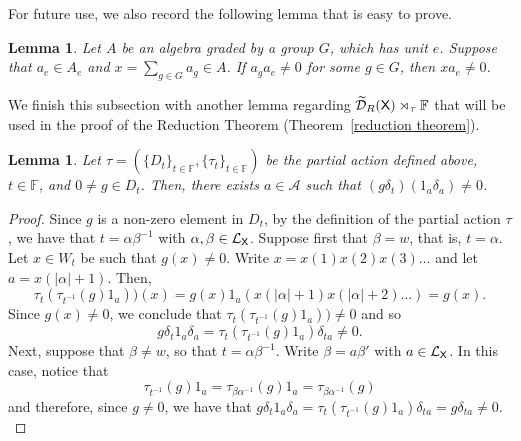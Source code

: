 \documentclass[a4paper,12pt]{amsart}
\newtheorem{lemma}[equation]{Lemma}
\theoremstyle{definition}
\theoremstyle{remark}
\numberwithin{equation}{section}
\newcommand{\osf}{{\normalfont \textsf{X}}}
\newcommand{\lang}{\CL_{\osf}}
\newcommand{\udalgshift}{\TCD_R(\osf)}
\newcommand{\alf}{\mathscr{A}}
\newcommand{\F}{\mathbb{F}}
\newcommand{\CD}{\mathcal{D}}
\newcommand{\CL}{\mathcal{L}}
\newcommand{\TCD}{\widetilde{\CD}}
\begin{document}
For future use, we also record the following lemma that is easy to prove.

\begin{lemma}\label{referee} Let $A$ be an algebra graded by a group $ G$, which has unit $e$. Suppose that $a_e\in A_e$ and $x=\sum_{g \in G} a_g \in A$. If $ a_g a_e \neq 0$ for some $g \in G$, then $x a_e \neq 0$.
\end{lemma}

We finish this subsection with another lemma regarding $ \udalgshift\rtimes_{\tau}\F$ that will be used in the proof of the Reduction Theorem (Theorem~\ref{reduction theorem}).

\begin{lemma}\label{claim1}
    Let $\tau=\left( \{D_t\}_{t\in \F}, \{\tau_t\}_{t\in\F} \right)$ be the partial action defined above, $t\in \F$, and $0\neq g\in D_t$. Then, there exists $a\in \alf$ such that $(g\delta_t)( 1_a\delta_a)\neq 0$.
\end{lemma}
\begin{proof}
Since $g$ is a non-zero element in $D_t$, by the definition of the partial action $\tau$, we have that $t=\alpha\beta^{-1}$ with $\alpha, \beta \in \lang$. 
Suppose first that $\beta =w$, that is, $t=\alpha$. Let $x\in W_t$ be such that $g(x)\neq 0$. Write $x=x(1)x(2)x(3)\ldots$ and let $a=x({|\alpha|+1})$. Then, 
$$\tau_t(\tau_{t^{-1}}(g)1_a))(x)=g(x)1_a\left(x(|\alpha|+1)x(|\alpha|+2)\ldots\right)=g(x).$$ Since $g(x)\neq 0$, we conclude that  
$\tau_t(\tau_{t^{-1}}(g)1_a))\neq 0$ and so 
$$g\delta_t 1_a\delta_a=\tau_t(\tau_{t^{-1}}(g)1_a)\delta_{ta}\neq 0.$$
Next, suppose that $\beta \neq w$, so that $t=\alpha\beta^{-1}$. Write $\beta=a\beta'$ with $a\in \lang$. In this case, notice that 
$$\tau_{t^{-1}}(g)1_a=\tau_{\beta \alpha^{-1}}(g)1_a=\tau_{\beta \alpha^{-1}}(g)$$ 
and therefore, since $g\neq 0$, we have that
$g\delta_t 1_a\delta_a=\tau_t(\tau_{t^{-1}}(g)1_a)\delta_{ta}=g\delta_{ta}\neq 0.$
\end{proof}



\end{document}
